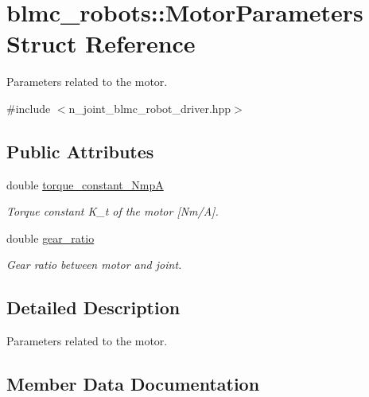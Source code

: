 \hypertarget{structblmc__robots_1_1MotorParameters}{}\section{blmc\+\_\+robots\+:\+:Motor\+Parameters Struct Reference}
\label{structblmc__robots_1_1MotorParameters}


Parameters related to the motor.  




{\ttfamily \#include $<$n\+\_\+joint\+\_\+blmc\+\_\+robot\+\_\+driver.\+hpp$>$}

\subsection*{Public Attributes}
\begin{DoxyCompactItemize}
\item 
double \hyperlink{structblmc__robots_1_1MotorParameters_a960e7f64dae8cd08837f8bff620eacfb}{torque\+\_\+constant\+\_\+\+NmpA}\hypertarget{structblmc__robots_1_1MotorParameters_a960e7f64dae8cd08837f8bff620eacfb}{}\label{structblmc__robots_1_1MotorParameters_a960e7f64dae8cd08837f8bff620eacfb}

\begin{DoxyCompactList}\small\item\em Torque constant K\+\_\+t of the motor \mbox{[}Nm/A\mbox{]}. \end{DoxyCompactList}\item 
double \hyperlink{structblmc__robots_1_1MotorParameters_a6a8158b9ac1633bab6181043d04ab655}{gear\+\_\+ratio}
\begin{DoxyCompactList}\small\item\em Gear ratio between motor and joint. \end{DoxyCompactList}\end{DoxyCompactItemize}


\subsection{Detailed Description}
Parameters related to the motor. 

\subsection{Member Data Documentation}
